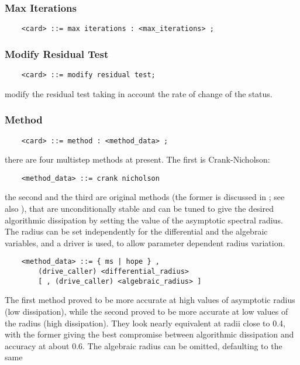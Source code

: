 \subsubsection{Max Iterations}
\begin{verbatim}
    <card> ::= max iterations : <max_iterations> ;
\end{verbatim}

\subsubsection{Modify Residual Test}
\begin{verbatim}
    <card> ::= modify residual test;
\end{verbatim}
modify the residual test taking in account the rate of change of the status.

\subsubsection{Method}
\begin{verbatim}
    <card> ::= method : <method_data> ;
\end{verbatim}
there are four multistep methods at present. 
The first is Crank-Nicholson:
\begin{verbatim}
    <method_data> ::= crank nicholson
\end{verbatim}
the second and the third are original 
methods (the former is discussed in \cite{MASARATI-LANZ-MANTEGAZZA-2001}; 
see also 
), 
that are unconditionally stable and can be tuned to give 
the desired algorithmic dissipation
by setting the value of the asymptotic spectral radius.
The radius can be set independently for the differential
and the algebraic variables, and a driver is used, to allow parameter 
dependent radius variation.
\begin{verbatim}
    <method_data> ::= { ms | hope } ,
        (drive_caller) <differential_radius>
        [ , (drive_caller) <algebraic_radius> ]
\end{verbatim}
The first method proved to be more accurate at high values of asymptotic
radius (low dissipation), while the second proved to be more accurate
at low values of the radius (high dissipation).
They look nearly equivalent at radii close to 0.4, with the former
giving the best compromise between algorithmic dissipation and accuracy 
at about 0.6.
The algebraic radius can be omitted, defaulting to the same 
